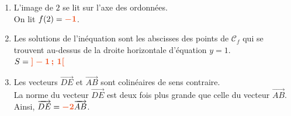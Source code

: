 \documentclass[a4paper,11pt]{article}
\begin{document}
\begin{seance}{}
\begin{enumerate}
	\item L'image de $2$ se lit sur l'axe des ordonnées. \\
              On lit $f(2)={\color[HTML]{f15929}\boldsymbol{-1}}$. 
	\item Les solutions de l'inéquation sont les abscisses des points de $\mathscr{C}_f$ qui se trouvent au-dessus de la droite horizontale d'équation $y=1$.\\
    $S={\color[HTML]{f15929}\boldsymbol{]-1\,;\,1[}}$ 
    \item Les vecteurs $\overrightarrow{DE}$ et $\overrightarrow{AB}$ sont colinéaires de sens contraire.\\
   La norme du vecteur  $\overrightarrow{DE}$ est deux fois plus grande que celle du vecteur  $\overrightarrow{AB}$. \\
    Ainsi, $\overrightarrow{DE}={\color[HTML]{f15929}\boldsymbol{-2}}\overrightarrow{AB}$.

\end{enumerate}

\end{seance}
\end{document}
